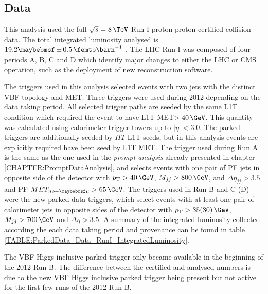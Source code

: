 \subsection{Data}


This analysis used the full  $\sqrt{s}=8\,\TeV$ Run I proton-proton certified collision data. The total integrated luminosity analysed is $19.2 \pm 0.5 \,\femto\barn^{-1}$ \cite{ARTICLE:CMSLuminosityBasedonPixelClusterCounting}. The \gls{LHC} Run I was composed of four periods A, B, C and D which identify major changes to either the \gls{LHC} or \gls{CMS} operation, such as the deployment of new reconstruction software.

The triggers used in this analysis selected events with two jets with the distinct \gls{VBF} topology and \gls{MET}. Three triggers were used during 2012 depending on the data taking period. All selected trigger paths are seeded by the same \gls{L1T} condition which required the event to have \gls{L1T} \gls{MET}$>40\,\GeV$. This quantity was calculated using calorimeter trigger towers up to $|\eta|<3.0$. The parked triggers are additionally seeded by $HT$ \gls{L1T} seeds, but in this analysis events are explicitly required have been seed by \gls{L1T} \gls{MET}. The trigger used during Run A is the same as the one used in the \textit{prompt analysis} already presented in chapter \ref{CHAPTER:PromptDataAnalysis}, and selects events with one pair of \gls{PF} jets in opposite side of the detector with $\pt>40\,\GeV$, $M_{jj}>800\,\GeV$, and $\Delta\eta_{jj}>3.5$ and \gls{PF} $MET_{no-\mu}>65\,\GeV$. The triggers used in Run B and C (D) were the new parked data triggers, which select events with at least one pair of calorimeter jets in opposite sides of the detector with $\pt>35(30)\,\GeV$, $M_{jj}>700\,\GeV$ and $\Delta\eta>3.5$. A summary of the integrated luminosity collected according the each data taking period and provenance can be found in table \ref{TABLE:ParkedData_Data_RunI_IntegratedLuminosity}.



The \gls{VBF} Higgs inclusive parked trigger only became available in the beginning of the 2012 Run B. The difference between the certified and analysed numbers is due to the new \gls{VBF} Higgs inclusive parked trigger being present but not active for the first few runs of the 2012 Run B. 

